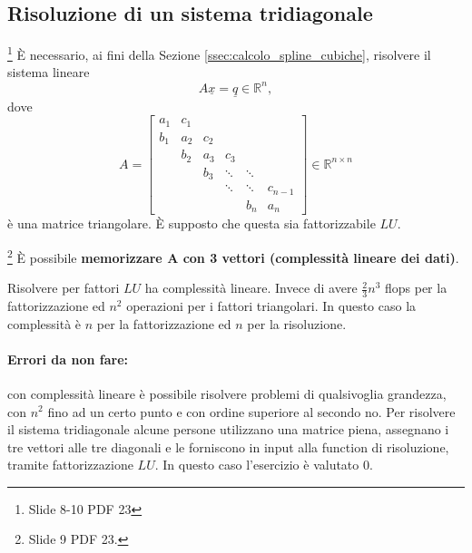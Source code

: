 \subsection{Risoluzione di un sistema tridiagonale}\label{ssec:risoluzione_sistema_tridiagonale}
\footnote{Slide 8-10 PDF 23} È necessario, ai fini della Sezione \ref{ssec:calcolo_spline_cubiche}, risolvere il sistema lineare
\begin{equation*}
    A\underline{x}=\underline{q}\in\mathbb{R}^n,
\end{equation*}
dove
\begin{equation*}
    A=
    \begin{bmatrix}
        a_1 & c_1 & & & &\\
        b_1 & a_2 & c_2 & & &\\
            & b_2 & a_3 & c_3 & &\\
            & & b_3 &\ddots & \ddots &\\
            & & & \ddots & \ddots & c_{n-1}\\
            & & & &  b_n & a_n
    \end{bmatrix}
    \in\mathbb{R}^{n\times n}
\end{equation*}
è una matrice triangolare. È supposto che questa sia fattorizzabile $LU$.

\begin{remark}\footnote{Slide 9 PDF 23.}
    È possibile \textbf{memorizzare $\boldsymbol A$ con 3 vettori (complessità lineare dei dati)}.
\end{remark}

\noindent Risolvere per fattori $LU$ ha complessità lineare. Invece di avere $\frac{2}{3}n^3$ flops per la fattorizzazione ed $n^2$ operazioni per i fattori triangolari. In questo caso la complessità è $n$ per la fattorizzazione ed $n$ per la risoluzione.

\paragraph{Errori da non fare:} con complessità lineare è possibile risolvere problemi di qualsivoglia grandezza, con $n^2$ fino ad un certo punto e con ordine superiore al secondo no. Per risolvere il sistema tridiagonale alcune persone utilizzano una matrice piena, assegnano i tre vettori alle tre diagonali e le forniscono in input alla function di risoluzione, tramite fattorizzazione $LU$. In questo caso l'esercizio è valutato 0.

